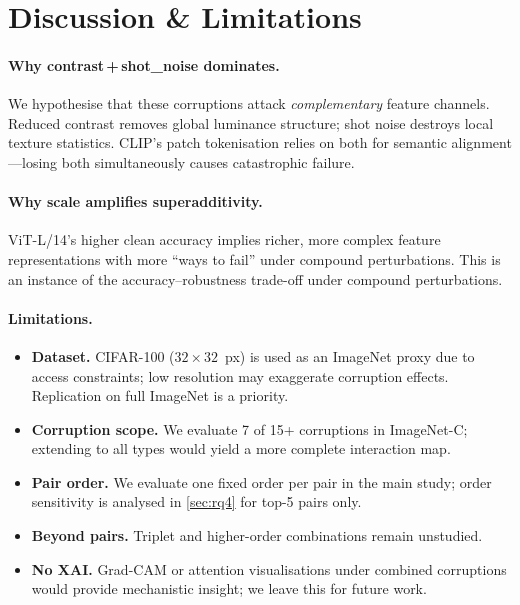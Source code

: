 \documentclass[10pt, twocolumn]{article}
\begin{document}
\section{Discussion \& Limitations}
\label{sec:discussion}

\paragraph{Why contrast\,+\,shot\_noise dominates.}
We hypothesise that these corruptions attack
\emph{complementary} feature channels.
Reduced contrast removes global luminance structure;
shot noise destroys local texture statistics.
CLIP's patch tokenisation relies on both for semantic
alignment---losing both simultaneously causes
catastrophic failure.

\paragraph{Why scale amplifies superadditivity.}
ViT-L/14's higher clean accuracy implies richer,
more complex feature representations with more
``ways to fail'' under compound perturbations.
This is an instance of the accuracy--robustness
trade-off under compound perturbations.

\paragraph{Limitations.}
\begin{itemize}[leftmargin=*]
  \item \textbf{Dataset.} CIFAR-100 ($32{\times}32$~px)
        is used as an ImageNet proxy due to access
        constraints; low resolution may exaggerate
        corruption effects.
        Replication on full ImageNet is a priority.
  \item \textbf{Corruption scope.} We evaluate 7 of
        15+ corruptions in ImageNet-C; extending to
        all types would yield a more complete
        interaction map.
  \item \textbf{Pair order.} We evaluate one fixed
        order per pair in the main study; order
        sensitivity is analysed in \cref{sec:rq4}
        for top-5 pairs only.
  \item \textbf{Beyond pairs.} Triplet and
        higher-order combinations remain unstudied.
  \item \textbf{No XAI.} Grad-CAM or attention
        visualisations under combined corruptions
        would provide mechanistic insight; we leave
        this for future work.
\end{itemize}
\end{document}
